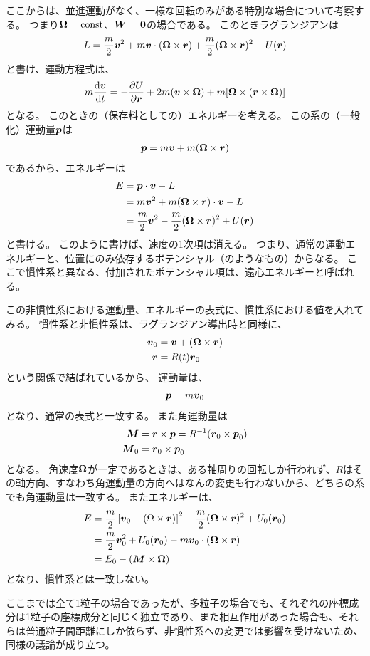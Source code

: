 \documentclass[a4paper]{jsarticle}
\def\vec#1{\mbox{\boldmath $#1$}}
\newcommand{\dif}[2]{\frac{{\rm d} #1}{{\rm d} #2}}
\newcommand{\pdif}[2]{\frac{\partial #1}{\partial #2}}
\begin{document}
ここからは、並進運動がなく、一様な回転のみがある特別な場合について考察する。
つまり$\vec{\Omega} = {\rm const}$、$\vec{W} = \vec{0}$の場合である。
このときラグランジアンは
\begin{align}
	L = \frac{m}{2} \vec{v}^2 + m \vec{v} \cdot (\vec{\Omega} \times \vec{r})
	+ \frac{m}{2} (\vec{\Omega} \times \vec{r})^2 - U(\vec{r})
\end{align}
と書け、運動方程式は、
\begin{align}
	m \dif{\vec{v}}{t} = -\pdif{U}{\vec{r}}	+ 2m(\vec{v} \times \vec{\Omega})
	+ m[\vec{\Omega} \times (\vec{r} \times \vec{\Omega})]
\end{align}
となる。
このときの（保存料としての）エネルギーを考える。
この系の（一般化）運動量$\vec{p}$は
\begin{align}
	\vec{p} = m\vec{v} + m(\vec{\Omega} \times \vec{r})
\end{align}
であるから、エネルギーは
\begin{align}
	E &= \vec{p} \cdot \vec{v} - L \\
	&= m \vec{v}^2 + m(\vec{\Omega} \times \vec{r}) \cdot \vec{v} - L \\
	&= \frac{m}{2} \vec{v}^2 - \frac{m}{2} (\vec{\Omega} \times \vec{r})^2
	+ U(\vec{r})
\end{align}
と書ける。
このように書けば、速度の1次項は消える。
つまり、通常の運動エネルギーと、位置にのみ依存するポテンシャル（のようなもの）からなる。
ここで慣性系と異なる、付加されたポテンシャル項は、遠心エネルギーと呼ばれる。

この非慣性系における運動量、エネルギーの表式に、慣性系における値を入れてみる。
慣性系と非慣性系は、ラグランジアン導出時と同様に、
\begin{align}
	\vec{v}_0 &= \vec{v} + (\vec{\Omega} \times \vec{r}) \\
	\vec{r} &= R(t) \vec{r}_0
\end{align}
という関係で結ばれているから、
運動量は、
\begin{align}
	\vec{p} = m\vec{v}_0
\end{align}
となり、通常の表式と一致する。
また角運動量は
\begin{align}
	\vec{M} &= \vec{r} \times \vec{p} = R^{-1} (\vec{r}_0 \times \vec{p}_0) \\
	\vec{M}_0 &= \vec{r}_0 \times \vec{p}_0
\end{align}
となる。
角速度$\vec{\Omega}$が一定であるときは、ある軸周りの回転しか行われず、$R$はその軸方向、すなわち角運動量の方向へはなんの変更も行わないから、どちらの系でも角運動量は一致する。
またエネルギーは、
\begin{align}
	E &= \frac{m}{2} \left[ \vec{v}_0
	- (\Omega \times \vec{r}) \right]^2
	- \frac{m}{2} (\vec{\Omega} \times \vec{r})^2 + U_0(\vec{r}_0) \\
	&= \frac{m}{2} \vec{v}_0^2 + U_0(\vec{r}_0)
	- m\vec{v}_0 \cdot (\vec{\Omega} \times \vec{r}) \\
	&= E_0 - (\vec{M} \times \vec{\Omega})
\end{align}
となり、慣性系とは一致しない。

ここまでは全て1粒子の場合であったが、多粒子の場合でも、それぞれの座標成分は1粒子の座標成分と同じく独立であり、また相互作用があった場合も、それらは普通粒子間距離にしか依らず、非慣性系への変更では影響を受けないため、同様の議論が成り立つ。
\end{document}
